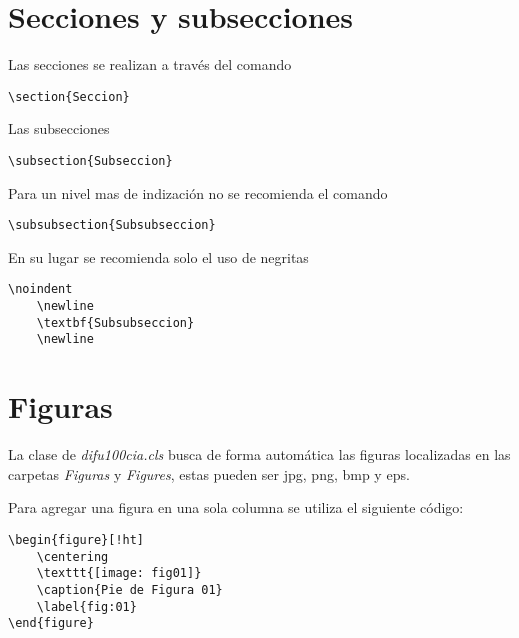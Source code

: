 \documentclass[12pt]{difu100cia} %
\begin{document}
\section{Secciones y subsecciones}

Las secciones se realizan a través del comando 

\begin{lstlisting}[basicstyle=\small]
    \section{Seccion} 
\end{lstlisting}

Las subsecciones 

\begin{lstlisting}[basicstyle=\small]
    \subsection{Subseccion} 
\end{lstlisting}

Para un nivel mas de indización no se recomienda el comando

\begin{lstlisting}[basicstyle=\small]
    \subsubsection{Subsubseccion} 
\end{lstlisting}

En su lugar se recomienda solo el uso de negritas

\begin{lstlisting}[basicstyle=\small]
    \noindent
    \newline
    \textbf{Subsubseccion}
    \newline
\end{lstlisting}

\section{Figuras}

La clase de \textit{difu100cia.cls} busca de forma automática las figuras localizadas en las carpetas \textit{Figuras} y \textit{Figures}, estas pueden ser jpg, png, bmp y eps.

Para agregar una figura en una sola columna se utiliza el siguiente código:

\begin{lstlisting}[basicstyle=\small]
    \begin{figure}[!ht]
	\centering
	\texttt{[image: fig01]}
	\caption{Pie de Figura 01}
	\label{fig:01}
\end{figure}
\end{lstlisting}
\end{document}
